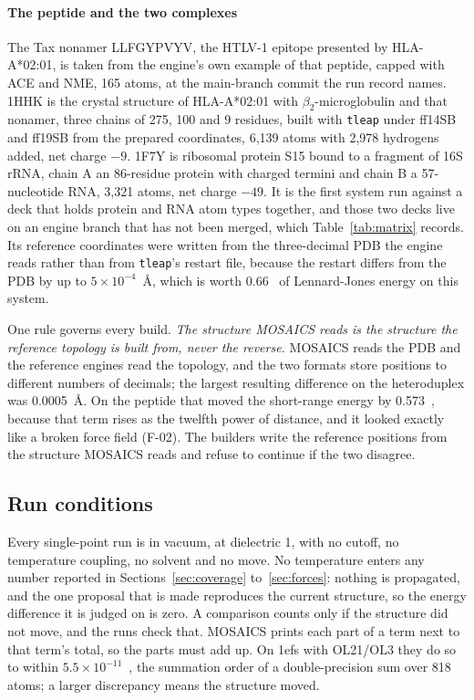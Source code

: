 \paragraph{The peptide and the two complexes}
The Tax nonamer LLFGYPVYV, the HTLV-1 epitope presented by HLA-A*02:01, is
taken from the engine's own example of that peptide, capped with ACE and NME,
165 atoms, at the main-branch commit the run record names. 1HHK is the crystal
structure of HLA-A*02:01 with $\beta_2$-microglobulin and that
nonamer\cite{pdb1hhk}, three chains of 275, 100 and 9 residues, built with
\texttt{tleap} under ff14SB and ff19SB from the prepared coordinates, 6,139
atoms with 2,978 hydrogens added, net charge $-9$. 1F7Y is ribosomal protein
S15 bound to a fragment of 16S rRNA\cite{pdb1f7y}, chain A an 86-residue
protein with charged termini and chain B a 57-nucleotide RNA, 3,321 atoms, net
charge $-49$. It is the first system run against a deck that holds protein and
RNA atom types together, and those two decks live on an engine branch that has
not been merged, which Table~\ref{tab:matrix} records. Its reference
coordinates were written from the three-decimal PDB the engine reads rather
than from \texttt{tleap}'s restart file, because the restart differs from the
PDB by up to $5\times10^{-4}$~\AA{}, which is worth 0.66~\kcal{} of
Lennard-Jones energy on this system.

One rule governs every build. \emph{The structure MOSAICS reads is the
structure the reference topology is built from, never the reverse.} MOSAICS
reads the PDB and the reference engines read the topology, and the two formats
store positions to different numbers of decimals; the largest resulting
difference on the heteroduplex was 0.0005~\AA{}. On the peptide that moved the
short-range energy by 0.573~\kcal{}, because that term rises as the twelfth
power of distance, and it looked exactly like a broken force field (F-02). The
builders write the reference positions from the structure MOSAICS reads and
refuse to continue if the two disagree.

\subsection{Run conditions}
\label{sec:methods-conditions}

Every single-point run is in vacuum, at dielectric 1, with no cutoff, no
temperature coupling, no solvent and no move. No temperature enters any number
reported in Sections~\ref{sec:coverage} to~\ref{sec:forces}: nothing is
propagated, and the one proposal that is made reproduces the current structure,
so the energy difference it is judged on is zero. A comparison counts only if
the structure did not move, and the runs check that. MOSAICS prints each part
of a term next to that term's total, so the parts must add up. On 1efs with
OL21/OL3 they do so to within $5.5\times10^{-11}$~\kcal{}, the summation order
of a double-precision sum over 818 atoms; a larger discrepancy means the
structure moved.

